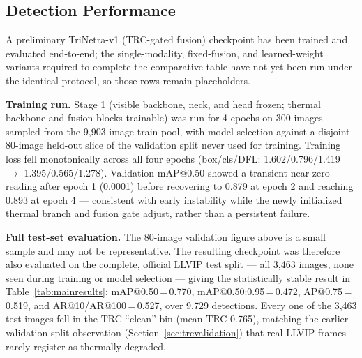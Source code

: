 \documentclass[conference]{IEEEtran}
\begin{document}
\subsection{Detection Performance}

A preliminary TriNetra-v1 (TRC-gated fusion) checkpoint has been
trained and evaluated end-to-end; the single-modality, fixed-fusion,
and learned-weight variants required to complete the comparative
table have not yet been run under the identical protocol, so those
rows remain placeholders.

\textbf{Training run.} Stage 1 (visible backbone, neck, and head
frozen; thermal backbone and fusion blocks trainable) was run for 4
epochs on 300 images sampled from the 9{,}903-image train pool, with
model selection against a disjoint 80-image held-out slice of the
validation split never used for training. Training loss fell
monotonically across all four epochs (box/cls/DFL: 1.602/0.796/1.419
$\rightarrow$ 1.395/0.565/1.278). Validation mAP@0.50 showed a
transient near-zero reading after epoch 1 (0.0001) before recovering
to 0.879 at epoch 2 and reaching 0.893 at epoch 4 --- consistent with
early instability while the newly initialized thermal branch and
fusion gate adjust, rather than a persistent failure.

\textbf{Full test-set evaluation.} The 80-image validation figure
above is a small sample and may not be representative. The resulting
checkpoint was therefore also evaluated on the complete, official
LLVIP test split --- all 3{,}463 images, none seen during training or
model selection --- giving the statistically stable result in
Table~\ref{tab:mainresults}: mAP@0.50\,=\,0.770, mAP@0.50:0.95\,=\,0.472,
AP@0.75\,=\,0.519, and AR@10/AR@100\,=\,0.527, over 9{,}729 detections.
Every one of the 3{,}463 test images fell in the TRC ``clean'' bin
(mean TRC 0.765), matching the earlier validation-split observation
(Section~\ref{sec:trcvalidation}) that real LLVIP frames rarely
register as thermally degraded.
\end{document}
